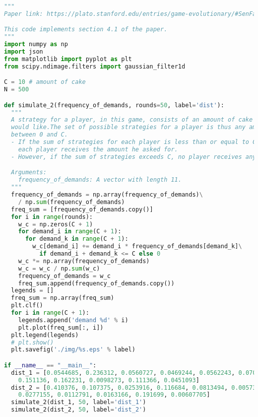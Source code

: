 \begin{lstlisting}[language=Python]
"""
Paper link: https://plato.stanford.edu/entries/game-evolutionary/#SenFai

This code implements section 4.1 of the paper.
"""
import numpy as np
import json
from matplotlib import pyplot as plt
from scipy.ndimage.filters import gaussian_filter1d

C = 10 # amount of cake
N = 500

def simulate_2(frequency_of_demands, rounds=50, label='dist'):
  """
  A strategy for a player, in this game, consists of an amount of cake that he
  would like.The set of possible strategies for a player is thus any amount
  between 0 and C.
  - If the sum of strategies for each player is less than or equal to C,
    each player receives the amount he asked for.
  - However, if the sum of strategies exceeds C, no player receives anything.

  Arguments:
    frequency_of_demands: A vector with length 11.
  """
  frequency_of_demands = np.array(frequency_of_demands)\
    / np.sum(frequency_of_demands)
  freq_sum = [frequency_of_demands.copy()]
  for i in range(rounds):
    w_c = np.zeros(C + 1)
    for demand_i in range(C + 1):
      for demand_k in range(C + 1):
        w_c[demand_i] += demand_i * frequency_of_demands[demand_k]\
          if demand_i + demand_k <= C else 0
    w_c *= np.array(frequency_of_demands)
    w_c = w_c / np.sum(w_c)
    frequency_of_demands = w_c
    freq_sum.append(frequency_of_demands.copy())
  legends = []
  freq_sum = np.array(freq_sum)
  plt.clf()
  for i in range(C + 1):
    legends.append('demand %d' % i)
    plt.plot(freq_sum[:, i])
  plt.legend(legends)
  # plt.show()
  plt.savefig('./img/%s.eps' % label)

if __name__ == "__main__":
  dist_1 = [0.0544685, 0.236312, 0.0560727, 0.0469244, 0.0562243, 0.0703294,
    0.151136, 0.162231, 0.0098273, 0.111366, 0.0451093]
  dist_2 = [0.410376, 0.107375, 0.0253916, 0.116684, 0.0813494, 0.00573677,
    0.0277155, 0.0112791, 0.0163166, 0.191699, 0.00607705]
  simulate_2(dist_1, 50, label='dist_1')
  simulate_2(dist_2, 50, label='dist_2')\end{lstlisting}\pagebreak